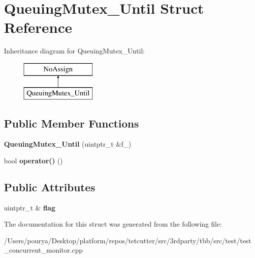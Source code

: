 \hypertarget{structQueuingMutex__Until}{}\section{Queuing\+Mutex\+\_\+\+Until Struct Reference}
\label{structQueuingMutex__Until}
Inheritance diagram for Queuing\+Mutex\+\_\+\+Until\+:\begin{figure}[H]
\begin{center}
\leavevmode
\includegraphics[height=2.000000cm]{structQueuingMutex__Until}
\end{center}
\end{figure}
\subsection*{Public Member Functions}
\begin{DoxyCompactItemize}
\item 
\hypertarget{structQueuingMutex__Until_ab8ae3446db6535b0ad0d8b6c8a0b0f5a}{}{\bfseries Queuing\+Mutex\+\_\+\+Until} (uintptr\+\_\+t \&f\+\_\+)\label{structQueuingMutex__Until_ab8ae3446db6535b0ad0d8b6c8a0b0f5a}

\item 
\hypertarget{structQueuingMutex__Until_a60bad7806729a590f495d988e1e1a1d1}{}bool {\bfseries operator()} ()\label{structQueuingMutex__Until_a60bad7806729a590f495d988e1e1a1d1}

\end{DoxyCompactItemize}
\subsection*{Public Attributes}
\begin{DoxyCompactItemize}
\item 
\hypertarget{structQueuingMutex__Until_ac4f45df558e76e0991d565106333ab70}{}uintptr\+\_\+t \& {\bfseries flag}\label{structQueuingMutex__Until_ac4f45df558e76e0991d565106333ab70}

\end{DoxyCompactItemize}


The documentation for this struct was generated from the following file\+:\begin{DoxyCompactItemize}
\item 
/\+Users/pourya/\+Desktop/platform/repos/tetcutter/src/3rdparty/tbb/src/test/test\+\_\+concurrent\+\_\+monitor.\+cpp\end{DoxyCompactItemize}

